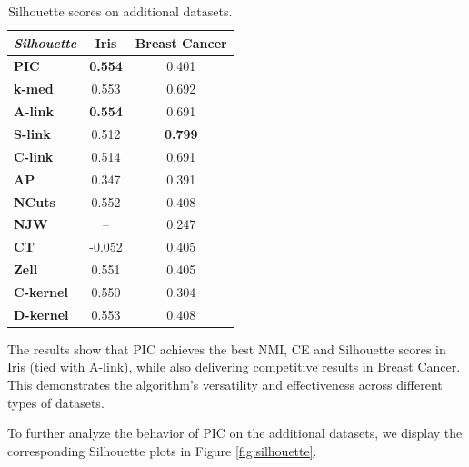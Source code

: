 \begin{table}[h]
    \centering
    \begin{tabular}{|l|c|c|}
        \hline
        \textit{Silhouette} & \textbf{Iris} & \textbf{Breast Cancer} \\
        \hline
        \textbf{PIC}       & \textbf{0.554} & 0.401 \\ \hline
        \textbf{k-med}     & 0.553 & 0.692 \\ \hline
        \textbf{A-link}    & \textbf{0.554} & 0.691 \\ \hline
        \textbf{S-link}    & 0.512 & \textbf{0.799} \\ \hline
        \textbf{C-link}    & 0.514 & 0.691 \\ \hline
        \textbf{AP}        & 0.347 & 0.391 \\ \hline
        \textbf{NCuts}     & 0.552 & 0.408 \\ \hline
        \textbf{NJW}       & -- & 0.247 \\ \hline
        \textbf{CT}        & -0.052 & 0.405 \\ \hline
        \textbf{Zell}      & 0.551 & 0.405 \\ \hline
        \textbf{C-kernel}  & 0.550 & 0.304 \\ \hline
        \textbf{D-kernel}  & 0.553 & 0.408 \\
        \hline
        \end{tabular}
    \caption{Silhouette scores on additional datasets.}
    \label{table:silhouette_additional}
\end{table}

The results show that PIC achieves the best NMI, CE and Silhouette scores in Iris (tied with A-link), while also delivering competitive results in Breast Cancer. This demonstrates the algorithm's versatility and effectiveness across different types of datasets.

To further analyze the behavior of PIC on the additional datasets, we display the corresponding Silhouette plots in Figure \ref{fig:silhouette}.

